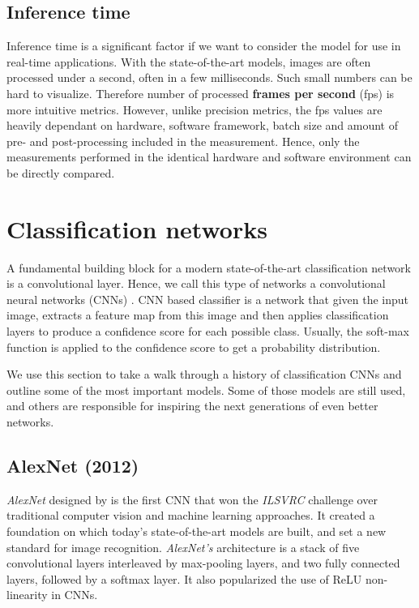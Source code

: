 \subsection*{Inference time}
Inference time is a significant factor if we want to consider the model for use in real-time applications. With the state-of-the-art models, images are often processed under a second, often in a few milliseconds. Such small numbers can be hard to visualize. Therefore number of processed \textbf{frames per second} (fps) is more intuitive metrics. However, unlike precision metrics, the fps values are heavily dependant on hardware, software framework, batch size and amount of pre- and post-processing included in the measurement. Hence, only the measurements performed in the identical hardware and software environment can be directly compared.

\section{Classification networks}
\label{sec:clsnets}
A fundamental building block for a modern state-of-the-art classification network is a convolutional layer. Hence, we call this type of networks a convolutional neural networks (CNNs) \cite[ch.~9]{bib:dlbook}. CNN based classifier is a network that given the input image, extracts a feature map from this image and then applies classification layers to produce a confidence score for each possible class. Usually, the soft-max function is applied to the confidence score to get a probability distribution.

We use this section to take a walk through a history of classification CNNs and outline some of the most important models. Some of those models are still used, and others are responsible for inspiring the next generations of even better networks.

\subsection{AlexNet (2012)}
\textit{AlexNet} designed by \citeauthor{bib:alexnet} \cite{bib:alexnet} is the first CNN that won the \textit{ILSVRC} challenge over traditional computer vision and machine learning approaches. It created a foundation on which today's state-of-the-art models are built, and set a new standard for image recognition. \textit{AlexNet's} architecture is a stack of five convolutional layers interleaved by max-pooling layers, and two fully connected layers, followed by a softmax layer. It also popularized the use of ReLU non-linearity in CNNs.

